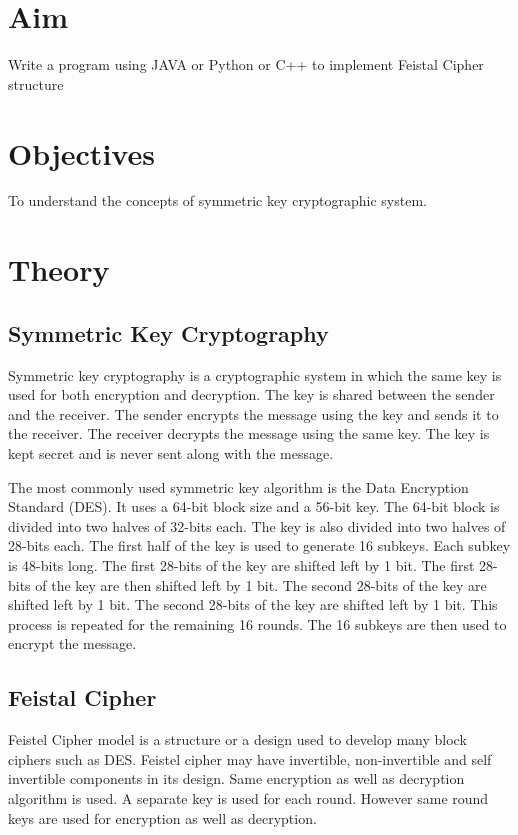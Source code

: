 \documentclass[11pt]{article}
\begin{document}
\tableofcontents
\thispagestyle{empty}
\clearpage

\setcounter{page}{1}

\section{Aim}
Write a program using JAVA or Python or C++ to implement Feistal Cipher structure

\section{Objectives}
To understand the concepts of symmetric key cryptographic system.

\section{Theory}
\subsection{Symmetric Key Cryptography}

Symmetric key cryptography is a cryptographic system in which the same key is used for both encryption and decryption. The key is shared between the sender and the receiver. The sender encrypts the message using the key and sends it to the receiver. The receiver decrypts the message using the same key. The key is kept secret and is never sent along with the message.

The most commonly used symmetric key algorithm is the Data Encryption Standard (DES). It uses a 64-bit block size and a 56-bit key. The 64-bit block is divided into two halves of 32-bits each. The key is also divided into two halves of 28-bits each. The first half of the key is used to generate 16 subkeys. Each subkey is 48-bits long. The first 28-bits of the key are shifted left by 1 bit. The first 28-bits of the key are then shifted left by 1 bit. The second 28-bits of the key are shifted left by 1 bit. The second 28-bits of the key are shifted left by 1 bit. This process is repeated for the remaining 16 rounds. The 16 subkeys are then used to encrypt the message.

\subsection{Feistal Cipher}

Feistel Cipher model is a structure or a design used to develop many block ciphers such as DES. Feistel cipher may have invertible, non-invertible and self invertible components in its design. Same encryption as well as decryption algorithm is used. A separate key is used for each round. However same round keys are used for encryption as well as decryption.
\end{document}
